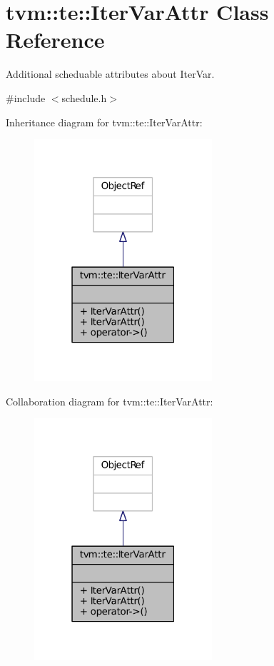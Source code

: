 \hypertarget{classtvm_1_1te_1_1IterVarAttr}{}\section{tvm\+:\+:te\+:\+:Iter\+Var\+Attr Class Reference}
\label{classtvm_1_1te_1_1IterVarAttr}


Additional scheduable attributes about Iter\+Var.  




{\ttfamily \#include $<$schedule.\+h$>$}



Inheritance diagram for tvm\+:\+:te\+:\+:Iter\+Var\+Attr\+:
\nopagebreak
\begin{figure}[H]
\begin{center}
\leavevmode
\includegraphics[width=187pt]{classtvm_1_1te_1_1IterVarAttr__inherit__graph}
\end{center}
\end{figure}


Collaboration diagram for tvm\+:\+:te\+:\+:Iter\+Var\+Attr\+:
\nopagebreak
\begin{figure}[H]
\begin{center}
\leavevmode
\includegraphics[width=187pt]{classtvm_1_1te_1_1IterVarAttr__coll__graph}
\end{center}
\end{figure}

